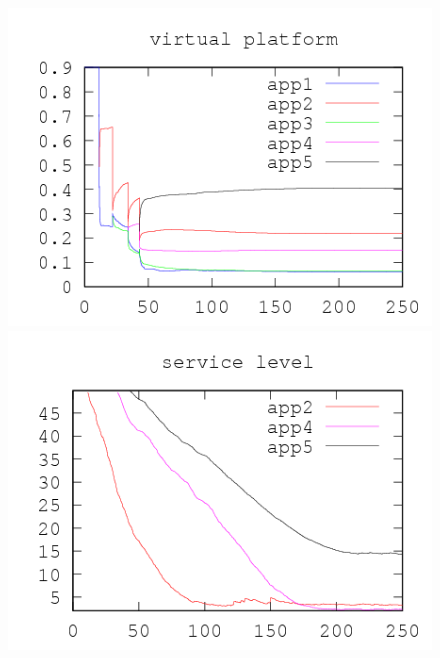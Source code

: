 \documentclass[nobiblatex]{LTHthesis}
\begin{document}
\begin{figure}[th]
\centering
  \begin{minipage}{0.49\textwidth}
  \centering
  \includegraphics[width=\textwidth]{"tools/plot/logs/test6/vp"}
  \end{minipage}
  \hfill
  \begin{minipage}{0.49\textwidth}
  \centering
  \includegraphics[width=\textwidth]{"tools/plot/logs/test6/sl"}
  \end{minipage}
  \begin{minipage}{0.49\textwidth}
  \centering

\end{minipage}
\end{figure}
\end{document}
